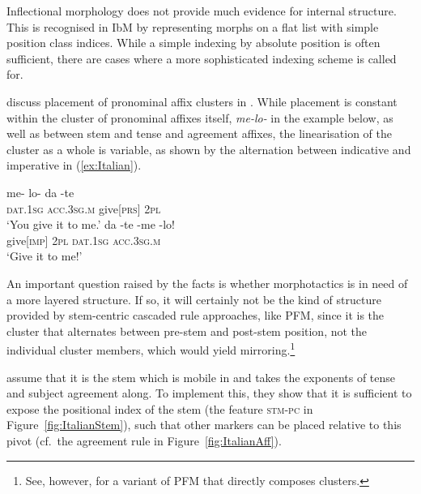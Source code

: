 \documentclass[output=paper
 	        ,biblatex
                ,babelshorthands
                ,newtxmath
                ,draftmode
                ,colorlinks, citecolor=brown
]{langscibook}
\begin{document}
\begin{exe}
\begin{xlist}
\begin{exe}
\begin{xlist}
\medskip
Inflectional morphology does not provide much evidence for internal
structure. This is recognised in IbM by representing morphs on a flat
list with simple position class indices. While a simple indexing by
absolute position is often sufficient, there are cases where a more
sophisticated indexing scheme is called
for.

\citet{Crysmann:Bonami:2016} discuss placement of pronominal affix
clusters in . While placement is constant within the cluster of
pronominal affixes
itself, \textit{me-lo-} in the example below, as well as
between stem and tense and agreement affixes, the linearisation of the
cluster as a whole is variable, as shown by the alternation between
indicative and imperative in (\ref{ex:Italian}).

\begin{exe}
  \ex\label{ex:Italian}
  \begin{xlist}
    \ex\gll me- lo- da -te\\
    \textsc{dat.1sg} \textsc{acc.3sg.m} give[\textsc{prs}] \textsc{2pl}\\
    \glt `You give it to me.'
    \ex\gll da -te -me -lo!\\
    give[\textsc{imp}] \textsc{2pl} \textsc{dat.1sg} \textsc{acc.3sg.m}\\
    \glt `Give it to me!'
  \end{xlist}
\end{exe}


An important question raised by the  facts is whether
morphotactics is in need of a more layered structure. If so, it will
certainly not be the kind of structure provided by stem-centric
cascaded rule approaches, like PFM, since it is the cluster that
alternates between pre-stem and post-stem position, not the individual
cluster members, which would yield mirroring.\footnote{See, however,
  \citet{Spencer05} for a variant of PFM that directly composes
  clusters.}

\citet{Crysmann:Bonami:2016} assume that it is the stem which is
mobile in  and takes the exponents of tense and subject
agreement along. To implement this, they show that it is sufficient to
expose the positional index of the stem (the feature \textsc{stm-pc}
in Figure~\ref{fig:ItalianStem}), such that other markers can
be placed relative to this pivot (cf.~the agreement rule in Figure~\ref{fig:ItalianAff}).  


\end{xlist}
\end{exe}
\end{xlist}
\end{exe}
\end{document}
